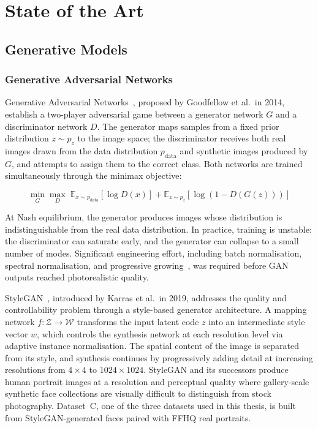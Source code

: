 \chapter{State of the Art}
\label{ch:related_work}


\section{Generative Models}
\label{sec:generative_models}

\subsection{Generative Adversarial Networks}
\label{subsec:gans}

Generative Adversarial Networks~\cite{goodfellow2014}, proposed by Goodfellow et al.\ in
2014, establish a two-player adversarial game between a generator network $G$ and a
discriminator network $D$. The generator maps samples from a fixed prior distribution
$z \sim p_z$ to the image space; the discriminator receives both real images drawn from
the data distribution $p_{\text{data}}$ and synthetic images produced by $G$, and
attempts to assign them to the correct class. Both networks are trained simultaneously
through the minimax objective:

\begin{equation}
  \min_G \max_D \;\mathbb{E}_{x \sim p_{\text{data}}}[\log D(x)]
  + \mathbb{E}_{z \sim p_z}[\log(1 - D(G(z)))]
  \label{eq:gan_objective}
\end{equation}

At Nash equilibrium, the generator produces images whose distribution is
indistinguishable from the real data distribution. In practice, training is unstable:
the discriminator can saturate early, and the generator can collapse to a small number
of modes. Significant engineering effort, including batch normalisation, spectral
normalisation, and progressive growing~\cite{karras2018progressive}, was required before GAN outputs reached
photorealistic quality.

StyleGAN~\cite{karras2019}, introduced by Karras et al.\ in 2019, addresses the quality
and controllability problem through a style-based generator architecture. A mapping
network $f: \mathcal{Z} \rightarrow \mathcal{W}$ transforms the input latent code $z$
into an intermediate style vector $w$, which controls the synthesis network at each
resolution level via adaptive instance normalisation. The spatial content of the image
is separated from its style, and synthesis continues by progressively adding detail at
increasing resolutions from $4\times4$ to $1024\times1024$. StyleGAN and its successors
produce human portrait images at a resolution and perceptual quality where gallery-scale
synthetic face collections are visually difficult to distinguish from stock photography. Dataset~C,
one of the three datasets used in this thesis, is built from StyleGAN-generated faces
paired with FFHQ real portraits.

